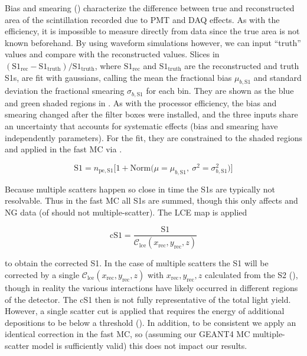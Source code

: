 Bias and smearing () characterize the difference between true and reconstructed area of the
scintillation recorded due to PMT and DAQ
effects.  As with the efficiency, it is impossible to measure directly from data since the true area is not known beforehand.  By using
waveform simulations however, we can input ``truth'' values and compare with the reconstructed values.  Slices in
$(\mathrm{S1_{rec}} - \mathrm{S1_{truth}}) / \mathrm{S1_{truth}}$, where
$\mathrm{S1_{rec}}$ and $\mathrm{S1_{truth}}$ are the reconstructed and truth S1s, are fit with gaussians, calling the mean
the fractional bias $\mu_{b, \mathrm{S1}}$ and standard deviation the fractional smearing $\sigma_{b, \mathrm{S1}}$ for each bin.  They
are shown as the blue and green shaded regions in
.  As with the processor efficiency, the bias and smearing changed after
the filter boxes were installed, and the three inputs share an uncertainty that accounts for systematic effects (bias and smearing have
independently parameters).  For the fit, they are constrained to the shaded regions and applied
in the fast MC via .

\begin{equation}
\mathrm{S1} = n_{\mathrm{pe,S1}} \Big[ 1 + \mathrm{Norm} \big( \mu = \mu_{b, \mathrm{S1}},\ \sigma^2 = \sigma_{b, \mathrm{S1}}^2 \big)
\Big]
\label{eq:er_nr_calibrations_parameter_determ_det_phys_s1_bias_smear}
\end{equation}

Because multiple scatters happen so close in time the S1s are typically not resolvable.  Thus in the fast MC all S1s are summed, though
this only affects \ambe and NG data (\betadecay of  should not multiple-scatter).  The LCE map is applied

\begin{equation}
\mathrm{cS1} = \frac{\mathrm{S1}}{\mathcal{C}_{\mathrm{lce}}(x_{\mathrm{rec}}, y_{\mathrm{rec}}, z)}
\label{eq:er_nr_calibrations_parameter_determ_det_phys_cs1}
\end{equation}

\noindent to obtain the corrected S1.  In the case of multiple scatters the S1 will be corrected by a single
$\mathcal{C}_{\mathrm{lce}}(x_{\mathrm{rec}}, y_{\mathrm{rec}}, z)$ with $x_{\mathrm{rec}}, y_{\mathrm{rec}}, z$ calculated from the S2
(), though in reality the various interactions have
likely occurred in different regions of the detector.  The cS1 then is not fully representative of the total light yield.  However,
a single scatter cut is applied that requires the energy of additional depositions to be below a threshold
().  In addition, to be
consistent we apply an identical correction in the fast MC, so (assuming our GEANT4 MC multiple-scatter model is sufficiently
valid) this does not impact our results.

